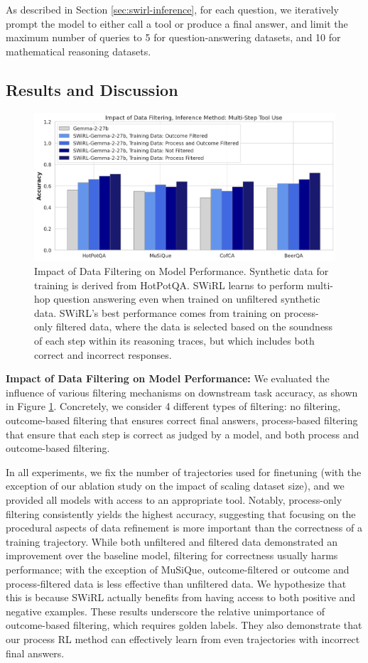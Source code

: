 \documentclass{article} %
\begin{document}
As described in Section \ref{sec:swirl-inference}, for each question, we iteratively prompt the model to either call a tool or produce a final answer, and limit the maximum number of queries to 5 for question-answering datasets, and 10 for mathematical reasoning datasets. 

\subsection{Results and Discussion} 
\begin{figure}[ht]
    \centering
    \includegraphics[width=.8\textwidth]{datafiltering.png}
    \caption{Impact of Data Filtering on Model Performance. Synthetic data for training is derived from HotPotQA. SWiRL learns to perform multi-hop question answering even when trained on unfiltered synthetic data. SWiRL's best performance comes from training on process-only filtered data, where the data is selected based on the soundness of each step within its reasoning traces, but which includes both correct and incorrect responses.}
    \label{fig:data_filtering}
\end{figure}
\noindent\textbf{Impact of Data Filtering on Model Performance:} We evaluated the influence of various filtering mechanisms on downstream task accuracy, as shown in Figure \ref{fig:data_filtering}. Concretely, we consider 4 different types of filtering: no filtering, outcome-based filtering that ensures correct final answers, process-based filtering that ensure that each step is correct as judged by a model, and both process and outcome-based filtering.

In all experiments, we fix the number of trajectories used for finetuning (with the exception of our ablation study on the impact of scaling dataset size), and we provided all models with access to an appropriate tool. Notably, process-only filtering consistently yields the highest accuracy, suggesting that focusing on the procedural aspects of data refinement is more important than the correctness of a training trajectory. While both unfiltered and filtered data demonstrated an improvement over the baseline model, filtering for correctness usually harms performance; with the exception of MuSiQue, outcome-filtered or outcome and process-filtered data is less effective than unfiltered data. We hypothesize that this is because SWiRL actually benefits from having access to both positive and negative examples. These results underscore the relative unimportance of outcome-based filtering, which requires golden labels. They also demonstrate that our process RL method can effectively learn from even trajectories with incorrect final answers. 
\end{document}
